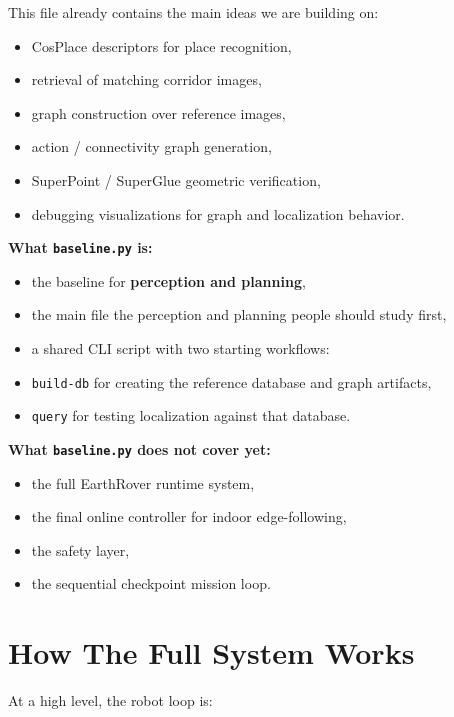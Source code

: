 \documentclass[11pt,a4paper]{article}
\begin{document}
This file already contains the main ideas we are building on:

\begin{itemize}[nosep]
  \item CosPlace descriptors for place recognition,
  \item retrieval of matching corridor images,
  \item graph construction over reference images,
  \item action / connectivity graph generation,
  \item SuperPoint / SuperGlue geometric verification,
  \item debugging visualizations for graph and localization behavior.
\end{itemize}

\textbf{What \texttt{baseline.py} is:}

\begin{itemize}[nosep]
  \item the baseline for \textbf{perception and planning},
  \item the main file the perception and planning people should study first,
  \item a shared CLI script with two starting workflows:
  \item \texttt{build-db} for creating the reference database and graph artifacts,
  \item \texttt{query} for testing localization against that database.
\end{itemize}

\textbf{What \texttt{baseline.py} does not cover yet:}

\begin{itemize}[nosep]
  \item the full EarthRover runtime system,
  \item the final online controller for indoor edge-following,
  \item the safety layer,
  \item the sequential checkpoint mission loop.
\end{itemize}


\section{How The Full System Works}

At a high level, the robot loop is:
\end{document}
